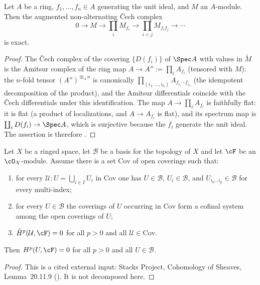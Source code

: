 \begin{lemma}
\label{lem:pc-affine-cech-complex}
Let $A$ be a ring, $f_1,\dots,f_n\in A$ generating the unit ideal, and
$M$ an $A$-module.  Then the augmented non-alternating Čech complex
\[
0\to M\longrightarrow\prod_{i}M_{f_i}
\longrightarrow\prod_{i<j}M_{f_if_j}\longrightarrow\cdots
\]
is exact.
\end{lemma}
\begin{proof}
The Čech complex of the covering $\{D(f_i)\}$ of $\Spec A$ with values
in $\widetilde M$ is the Amitsur complex of the ring map
$A\to A'':=\prod_iA_{f_i}$ (tensored with $M$): the $n$-fold tensor
$(A'')^{\otimes_A n}$ is canonically
$\prod_{(i_1,\dots,i_n)}A_{f_{i_1}\cdots f_{i_n}}$ (the idempotent
decomposition of the product), and the Amitsur differentials coincide
with the Čech differentials under this identification.  The map
$A\to\prod_iA_{f_i}$ is faithfully flat: it is flat (a product of
localizations, and $A\to A_{f_i}$ is flat), and its spectrum map is
$\coprod_iD(f_i)\to\Spec A$, which is surjective because the $f_i$
generate the unit ideal.  The assertion is therefore
.
\end{proof}

\begin{lemma}
\label{lem:pc-cech-vanishing-criterion}
Let $X$ be a ringed space, let $\mathcal B$ be a basis for the topology of
$X$ and let $\cF$ be an $\cO_X$-module.  Assume there is a set
$\mathrm{Cov}$ of open coverings such that:
\begin{enumerate}
\item for every $\mathcal U:U=\bigcup_{i\in I}U_i$ in $\mathrm{Cov}$ one has
$U\in\mathcal B$, $U_i\in\mathcal B$, and $U_{i_0\dots i_p}\in\mathcal B$
for every multi-index;
\item for every $U\in\mathcal B$ the coverings of $U$ occurring in
$\mathrm{Cov}$ form a cofinal system among the open coverings of $U$;
\item $\check H^p(\mathcal U,\cF)=0$ for all $p>0$ and all
$\mathcal U\in\mathrm{Cov}$.
\end{enumerate}
Then $H^p(U,\cF)=0$ for all $p>0$ and all $U\in\mathcal B$.
\end{lemma}
\begin{proof}
This is a cited external input: Stacks Project, Cohomology of Sheaves,
Lemma~20.11.9 ().  It is not decomposed here.
\end{proof}

